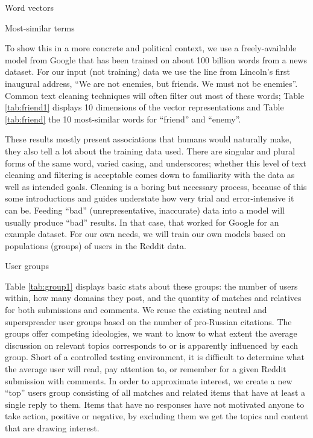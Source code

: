 \begin{table}[!ht]
\centering
\caption{Word vectors}

\label{tab:friend1}
\end{table}

\begin{table}[!ht]
\centering
\caption{Most-similar terms}

\label{tab:friend}
\end{table}

To show this in a more concrete and political context, we use a freely-available model from Google that has been trained on about 100 billion words from a news dataset.
For our input (not training) data we use the line from Lincoln's first inaugural address, ``We are not enemies, but friends. We must not be enemies''.
Common text cleaning techniques will often filter out most of these words; Table \ref{tab:friend1} displays 10 dimensions of the vector representations and Table \ref{tab:friend} the 10 most-similar words for ``friend'' and ``enemy''.

These results mostly present associations that humans would naturally make, they also tell a lot about the training data used.
There are singular and plural forms of the same word, varied casing, and underscores; whether this level of text cleaning and filtering is acceptable comes down to familiarity with the data as well as intended goals.
Cleaning is a boring but necessary process, because of this some introductions and guides understate how very trial and error-intensive it can be.
Feeding ``bad'' (unrepresentative, inaccurate) data into a model will usually produce ``bad'' results.
In that case, that worked for Google for an example dataset.
For our own needs, we will train our own models based on populations (groups) of users in the Reddit data.

\begin{table}[!ht]
\centering
\caption{User groups}

\label{tab:group1}
\end{table}

Table \ref{tab:group1} displays basic stats about these groups: the number of users within, how many domains they post, and the quantity of matches and relatives for both submissions and comments.
We reuse the existing neutral and superspreader user groups based on the number of pro-Russian citations.
The groups offer competing ideologies, we want to know to what extent the average discussion on relevant topics corresponds to or is apparently influenced by each group.
Short of a controlled testing environment, it is difficult to determine what the average user will read, pay attention to, or remember for a given Reddit submission with comments.
In order to approximate interest, we create a new ``top'' users group consisting of all matches and related items that have at least a single reply to them.
Items that have no responses have not motivated anyone to take action, positive or negative, by excluding them we get the topics and content that are drawing interest.

